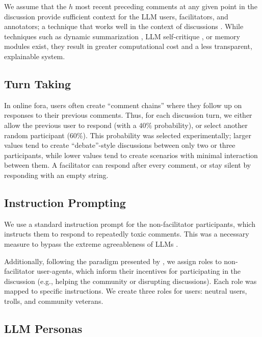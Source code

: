 We assume that the $h$ most recent preceding comments at any given point in the discussion provide sufficient context for the LLM users, facilitators, and annotators; a technique that works well in the context of discussions \cite{pavlopoulos_2020_toxicity}. While techniques such as dynamic summarization \cite{balog_2024}, LLM self-critique \cite{yu_2024_fincon}, or memory modules \cite{Vezhnevets2023GenerativeAM} exist, they result in greater computational cost and a less transparent, explainable system.


\subsection{Turn Taking}
\label{ssec:methodology:turn}

In online fora, users often create ``comment chains'' where they follow up on responses to their previous comments. Thus, for each discussion turn, we either allow the previous user to respond (with a $40\%$ probability), or select another random participant ($60\%$). This probability was selected experimentally; larger values tend to create ``debate''-style discussions between only two or three participants, while lower values tend to create scenarios with minimal interaction between them. A facilitator can respond after every comment, or stay silent by responding with an empty string.


\subsection{Instruction Prompting}
\label{ssec:methodology:prompts-instructions}

We use a standard instruction prompt for the non-facilitator participants, which instructs them to respond to repeatedly toxic comments. This was a necessary measure to bypass the extreme agreeableness of LLMs \cite{park2023game}.

Additionally, following the paradigm presented by \citet{abdelnabi_negotiations}, we assign roles to non-facilitator user-agents, which inform their incentives for participating in the discussion (e.g., helping the community or disrupting discussions). Each role was mapped to specific instructions. We create three roles for users: neutral users, trolls, and community veterans.    


\subsection{LLM Personas}    
\label{ssec:methodology:prompts-sdb}                

